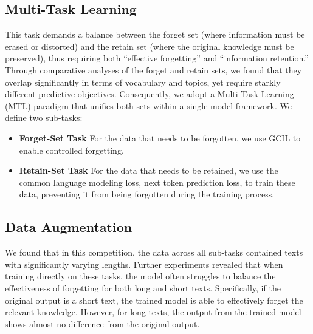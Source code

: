 \documentclass[11pt]{article}
\begin{document}
\subsection{Multi-Task Learning}

This task demands a balance between the forget set (where information must be erased or distorted) and the retain set (where the original knowledge must be preserved), thus requiring both “effective forgetting” and “information retention.” 
Through comparative analyses of the forget and retain sets, we found that they overlap significantly in terms of vocabulary and topics, yet require starkly different predictive objectives. 
Consequently, we adopt a Multi-Task Learning (MTL) paradigm that unifies both sets within a single model framework. We define two sub-tasks:

\begin{itemize}
	\item \noindent\textbf{Forget-Set Task} For the data that needs to be forgotten, we use GCIL to enable controlled forgetting.
	\item \noindent\textbf{Retain-Set Task} For the data that needs to be retained, we use the common language modeling loss, next token prediction loss, to train these data, preventing it from being forgotten during the training process.
\end{itemize}


\subsection{Data Augmentation} 

We found that in this competition, the data across all sub-tasks contained texts with significantly varying lengths. Further experiments revealed that when training directly on these tasks, the model often struggles to balance the effectiveness of forgetting for both long and short texts. Specifically, if the original output is a short text, the trained model is able to effectively forget the relevant knowledge. However, for long texts, the output from the trained model shows almost no difference from the original output.
\end{document}
